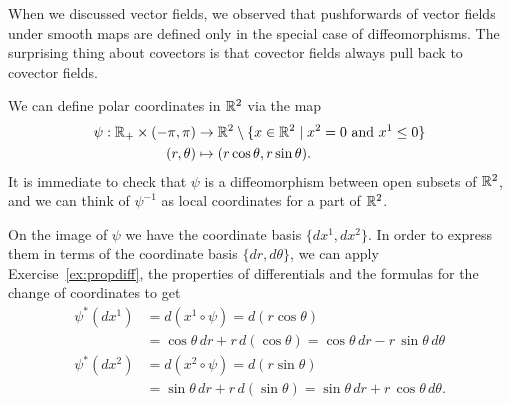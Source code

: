 When we discussed vector fields, we observed that pushforwards of vector fields under smooth maps are defined only in the special case of diffeomorphisms.
The surprising thing about covectors is that covector fields always pull back to covector fields.

\begin{example}
	We can define polar coordinates in $\mathbb{R}^2$ via the map
	\begin{align}
		\psi : \mathbb{R}_+\times (-\pi, \pi) & \to \mathbb{R}^2\setminus\{x\in\mathbb{R}^2\mid x^2=0 \mbox{ and } x^1 \leq 0\} \\
		(r, \theta)                   & \mapsto (r\cos\theta, r\sin\theta).
	\end{align}
	It is immediate to check that $\psi$ is a diffeomorphism between open subsets of $\mathbb{R}^2$, and we can think of $\psi^{-1}$ as local coordinates for a part of $\mathbb{R}^2$.

	On the image of $\psi$ we have the coordinate basis $\{dx^1, dx^2\}$. In order to express them in terms of the coordinate basis $\{dr,d\theta\}$, we can apply Exercise~\ref{ex:propdiff}, the properties of differentials and the formulas for the change of coordinates to get
	\begin{align}
		\psi^*(d x^1) & = d(x^1\circ \psi) = d(r\cos\theta)                                            \\
		              & = \cos\theta \,dr +r\,d(\cos\theta) = \cos\theta \,dr -r\,\sin\theta\,d\theta  \\
		\psi^*(d x^2) & = d(x^2\circ \psi) = d(r\sin\theta)                                            \\
		              & = \sin\theta \,dr +r\,d(\sin\theta) = \sin\theta \,dr +r\,\cos\theta\,d\theta.
	\end{align}
\end{example}

